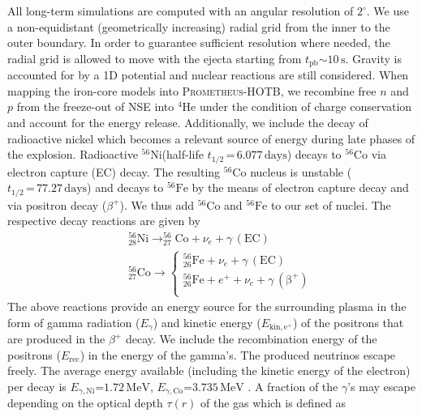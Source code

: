 \documentclass[fleqn,usenatbib]{mnras}
\newcommand{\tpb}{\ensuremath{t_{\text{pb}}}}
\newcommand{\helium}{\ensuremath{\mathrm{^{4}He}}\xspace}
\newcommand{\nickel}{\ensuremath{\mathrm{^{56}Ni}}\xspace}
\newcommand{\iron}{\ensuremath{\mathrm{^{56}Fe}}\xspace}
\newcommand{\cobalt}{\ensuremath{\mathrm{^{56}Co}}\xspace}
\newcommand{\s}{\ensuremath{\text{s}}}
\newcommand{\prom}{\textsc{Prometheus-HOTB}\xspace}
\newcommand{\GEO}[1]{{\color{red}#1}}
\begin{document}
All long-term simulations are computed with an angular resolution of $2^{\circ}$. We use a non-equidistant (geometrically increasing) radial grid from the inner to the outer boundary. In order to guarantee sufficient resolution where needed, the radial grid is allowed to move with the ejecta starting from $\tpb\mathord{\sim}10\,\s$. 
Gravity is accounted for by a 1D potential and nuclear reactions are still considered. 
\GEO{
When mapping the iron-core models into \prom, we recombine free $n$ and $p$ from the freeze-out of NSE into \helium under the condition of charge conservation and account for the energy release. } 
\GEO{
Additionally, we include the decay of radioactive nickel which becomes a relevant source of energy during late phases of the explosion.
Radioactive \nickel (half-life $t_{1/2}\,\mathord{=}\,  6.077\, \mathrm{days}$) decays to \cobalt via electron capture (EC) decay. The resulting \cobalt nucleus is unstable ($t_{1/2}\,\mathord{=}\, 77.27\, \mathrm{days}$) and decays to \iron by the means of electron capture decay and via positron decay ($\beta^+$). We thus add \cobalt and \iron to our set of nuclei.
The respective decay reactions are given by
\begin{eqnarray}
   && _{28}^{56}\mathrm{Ni} \rightarrow _{27}^{56}\mathrm{Co} + \nu_e + \gamma\, (\mathrm{EC}) \nonumber \\
   && _{27}^{56}\mathrm{Co} \rightarrow \begin{cases}
                                                        _{26}^{56}\mathrm{Fe} + \nu_e + \gamma \, (\mathrm{EC})\\
                                                        _{26}^{56}\mathrm{Fe} + e^+ + \nu_e + \gamma\, (\mathrm{\beta^+})\\
                                          \end{cases}
\end{eqnarray}
The above reactions provide an energy source for the surrounding plasma in the form of gamma radiation ($E_{\gamma}$) and kinetic energy ($E_{\mathrm{kin,e^{+}}}$) of the positrons that are produced in the $\beta^+$ decay. We include the recombination energy of the positrons ($E_{\mathrm{rec}}$) in the energy of the gamma's. The produced neutrinos escape freely.
The average energy available (including the kinetic energy of the electron) per decay is $E_{\gamma,\mathrm{Ni}}\mathord{=}1.72\,\mathrm{MeV}$, $E_{\gamma,\mathrm{Co}}\mathord{=}3.735\,\mathrm{MeV}$ \cite{Nadyozhin1994}.
A fraction of the $\gamma$'s may escape depending on the optical depth $\tau(r)$ of the gas which is defined as
}
\end{document}
